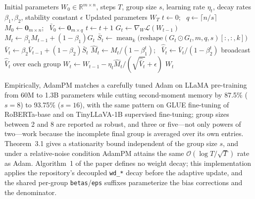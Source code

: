 \begin{algorithm}[H]
\caption{AdamPM (Pooled-Moment Adam)}
\label{alg:adampm}
\begin{algorithmic}[1]
\Require Initial parameters $W_0 \in \mathbb{R}^{m\times n}$, steps $T$, group size $s$, learning rate $\eta_t$, decay rates $\beta_1, \beta_2$, stability constant $\epsilon$
\Ensure Updated parameters $W_T$
\State $t \gets 0$; \ $q \gets \lceil n/s \rceil$ 
\State $M_0 \gets \mathbf{0}_{m\times n}$; \ $\bar{V}_0 \gets \mathbf{0}_{m\times q}$ 
\Repeat
    \State $t \gets t + 1$
    \State $G_t \gets \nabla_W \mathcal{L}(W_{t-1})$ 
    \State $M_t \gets \beta_1 M_{t-1} + (1-\beta_1) G_t$ 
    \State $\bar{S}_t \gets \operatorname{mean}_{k}\big(\mathrm{reshape}(G_t \odot G_t, m, q, s)[:,:,k]\big)$ 
    \State $\bar{V}_t \gets \beta_2 \bar{V}_{t-1} + (1-\beta_2) \bar{S}_t$ 
    \State $\hat{M}_t \gets M_t/(1-\beta_1^t)$; \ $\hat{\bar{V}}_t \gets \bar{V}_t/(1-\beta_2^t)$ 
    \State broadcast $\hat{\bar{V}}_t$ over each group 
    \State $W_t \gets W_{t-1} - \eta_t \hat{M}_t / (\sqrt{\hat{\bar{V}}_t} + \epsilon)$ 
\Return $W_t$
\end{algorithmic}
\end{algorithm}

Empirically, AdamPM matches a carefully tuned Adam on LLaMA pre-training from
60M to 1.3B parameters while cutting second-moment memory by 87.5\% ($s{=}8$)
to 93.75\% ($s{=}16$), with the same pattern on GLUE fine-tuning of RoBERTa-base
and on TinyLLaVA-1B supervised fine-tuning; group sizes between 2 and 8 are
reported as robust, and three or five---not only powers of two---work because
the incomplete final group is averaged over its own entries.
Theorem~3.1 gives a stationarity bound independent of the group size $s$, and
under a relative-noise condition AdamPM attains the same
$\mathcal{O}(\log T/\sqrt{T})$ rate as Adam. Algorithm~1 of the paper defines no
weight decay; this implementation applies the repository's decoupled
\texttt{wd\_*} decay before the adaptive update, and the shared per-group
\texttt{betas}/\texttt{eps} suffixes parameterize the bias corrections and the
denominator.

